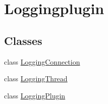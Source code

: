 \hypertarget{group__loggingplugin}{\section{\-Loggingplugin}
\label{group__loggingplugin}
}
\subsection*{\-Classes}
\begin{DoxyCompactItemize}
\item 
class \hyperlink{class_logging_connection}{\-Logging\-Connection}
\item 
class \hyperlink{class_logging_thread}{\-Logging\-Thread}
\item 
class \hyperlink{class_logging_plugin}{\-Logging\-Plugin}
\end{DoxyCompactItemize}
